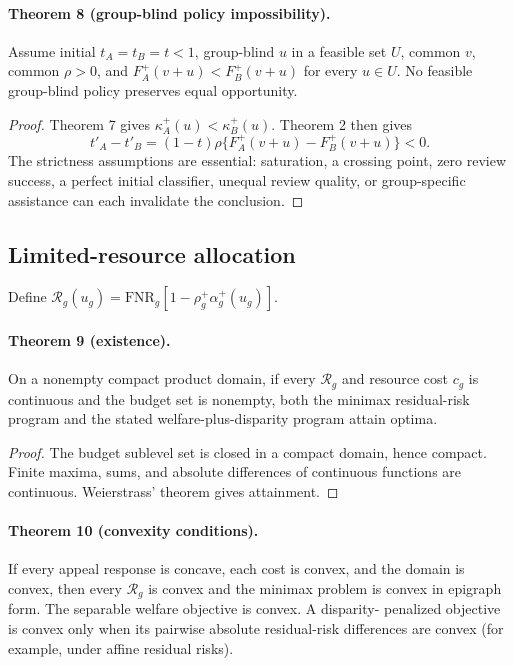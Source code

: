 \paragraph{Theorem 8 (group-blind policy impossibility).}
Assume initial $t_A=t_B=t<1$, group-blind $u$ in a feasible set $U$, common
$v$, common $\rho>0$, and
$F_A^+(v+u)<F_B^+(v+u)$ for every $u\in U$.  No feasible group-blind policy
preserves equal opportunity.

\begin{proof}
Theorem 7 gives $\kappa_A^+(u)<\kappa_B^+(u)$.  Theorem 2 then gives
\[
t'_A-t'_B=(1-t)\rho\{F_A^+(v+u)-F_B^+(v+u)\}<0.
\]
The strictness assumptions are essential: saturation, a crossing point,
zero review success, a perfect initial classifier, unequal review quality, or
group-specific assistance can each invalidate the conclusion.
\end{proof}

\subsection{Limited-resource allocation}

Define $\mathcal{R}_g(u_g)=
\mathrm{FNR}_g[1-\rho_g^+\alpha_g^+(u_g)]$.

\paragraph{Theorem 9 (existence).}
On a nonempty compact product domain, if every $\mathcal{R}_g$ and resource cost $c_g$
is continuous and the budget set is nonempty, both the minimax residual-risk
program and the stated welfare-plus-disparity program attain optima.

\begin{proof}
The budget sublevel set is closed in a compact domain, hence compact.  Finite
maxima, sums, and absolute differences of continuous functions are continuous.
Weierstrass' theorem gives attainment.
\end{proof}

\paragraph{Theorem 10 (convexity conditions).}
If every appeal response is concave, each cost is convex, and the domain is
convex, then every $\mathcal{R}_g$ is convex and the minimax problem is convex in
epigraph form.  The separable welfare objective is convex.  A disparity-
penalized objective is convex only when its pairwise absolute residual-risk
differences are convex (for example, under affine residual risks).

